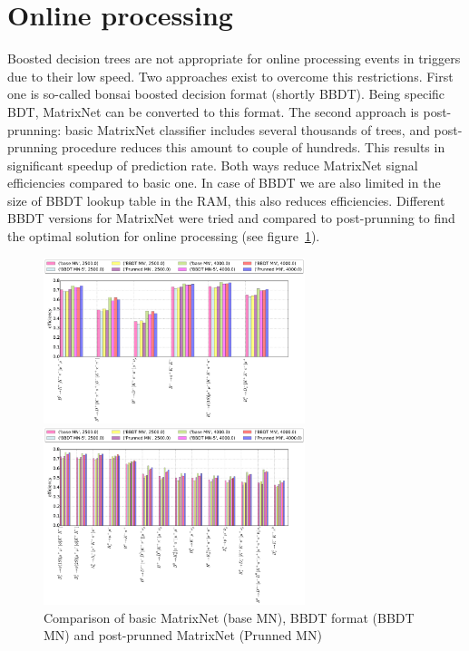 \documentclass[a4paper]{jpconf}
\begin{document}
\section{Online processing}
Boosted decision trees are not appropriate for online processing events in triggers due to their low speed. Two approaches exist to overcome this restrictions. First one is so-called bonsai boosted decision format\cite{bbdt} (shortly BBDT). Being specific BDT, MatrixNet can be converted to this format. The second approach is post-prunning: basic MatrixNet classifier includes several thousands of trees, and post-prunning procedure reduces this amount to couple of hundreds. This results in significant speedup of prediction rate. Both ways reduce MatrixNet signal efficiencies compared to basic one. In case of BBDT we are also limited in the size of BBDT lookup table in the RAM, this also reduces efficiencies. Different BBDT versions for MatrixNet were tried and compared to post-prunning to find the optimal solution for online processing (see figure~\ref{hlt2_prun}).
\begin{figure}[h]
\begin{minipage}{18pc}
\includegraphics[width=18pc]{../images/prun-base}
\end{minipage}\hspace{2pc}%
\begin{minipage}{18pc}
\includegraphics[width=18pc]{../images/prun}
\end{minipage} 
\caption{\label{hlt2_prun} Comparison of basic MatrixNet (base MN), BBDT format (BBDT MN) and post-prunned MatrixNet (Prunned MN)}
\end{figure}
\end{document}
